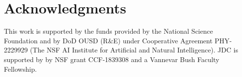 \section*{Acknowledgments}
This work is supported by the funds provided by the National Science Foundation and by DoD OUSD (R\&E) under Cooperative Agreement PHY-2229929 (The NSF AI Institute for Artificial and Natural Intelligence). JDC is supported by by NSF grant CCF-1839308 and a Vannevar Bush Faculty Fellowship.